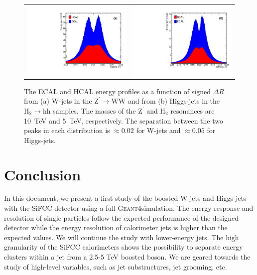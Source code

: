 \documentclass{PoS}
\newcommand{\GEANTfour} {{\textsc{Geant4}}}
\begin{document}
\begin{figure}
\begin{center}
\begin{tabular}{cc}
\includegraphics[width=.4\textwidth]{figs/ZprimeWW_h_signdR.pdf} &
\includegraphics[width=.4\textwidth]{figs/2HDM_h_signdR.pdf}\\
\end{tabular}
\end{center}
\caption{
The ECAL and HCAL energy profiles as a function of signed $\Delta R$ from 
(a) W-jets in the $\mathrm{Z}^{\prime}\rightarrow \mathrm{WW}$ and 
from (b) Higgs-jets in the $\mathrm{H}_2\rightarrow \mathrm{hh}$ 
samples. The masses of the $\mathrm{Z}^{\prime}$ and $\mathrm{H}_2$ resonances 
are 10~TeV and 5~TeV, respectively. The separation between the two peaks in 
each distribution is $\approx 0.02$ for W-jets and $\approx 0.05$ for 
Higgs-jets. }
\label{fig:angular}
\end{figure}


\section{Conclusion}
In this document, we present a first study of the boosted W-jets and 
Higgs-jets with the SiFCC detector using a full \GEANTfour simulation. The 
energy response and resolution of single particles follow the expected 
performance of the designed detector while the energy resolution of 
calorimeter jets is higher than the expected values. We will continue the 
study with lower-energy jets. The high granularity of the SiFCC calorimeters 
shows the possibility to separate energy 
clusters within a jet from a 2.5-5 TeV boosted boson. We are geared towards 
the study of high-level variables, such as jet substructures, jet grooming, 
etc.
\end{document}
